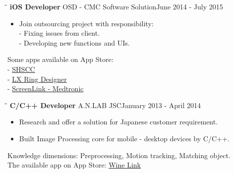\documentclass[margin, 10pt]{res}
\begin{document}
\begin{resume}
   \begin{tabbing}
   \hspace{2.0in}\= \hspace{2.0in}\= \kill %
   {\bf iOS Developer} \>OSD - CMC  Software Solution\>June 2014 - July 2015\\
   \end{tabbing}\vspace{-20pt} %

   \begin{itemize}
   		\item Join outsourcing project with responsibility: \\ - Fixing issues from client. \\ - Developing new functions and UIs. 
		
   \end{itemize}
   Some apps available on App Store:   
   \\ - {\color{blue}\href{https://itunes.apple.com/sg/app/shscc/id984461329?mt=8}{SHSCC}}
   \\ - {\color{blue}\href{https://itunes.apple.com/us/app/lx-ring-designer/id878072384?mt=8}{LX Ring Designer}}				
   \\ - {\color{blue}\href{https://itunes.apple.com/ca/app/screenlink-medtronic/id602846516?mt=8}{ScreenLink - Medtronic}}
   
   \begin{tabbing}
   \hspace{2.0in}\= \hspace{2.0in}\= \kill %
   {\bf C/C++ Developer} \>A.N.LAB JSC\>January 2013 - April 2014\\
   \end{tabbing}\vspace{-20pt} %

   \begin{itemize}
   		\item Research and offer a solution for Japanese customer requirement. 
		\item Built Image Processing core for mobile - desktop devices by C/C++.		
		
   \end{itemize}
   Knowledge dimensions: Preprocessing, Motion tracking, Matching object.   
   \\ The available app on App Store: {\color{blue}\href{https://itunes.apple.com/jp/app/wine-link/id395904799?mt=8}{Wine Link}}
	

\end{resume}
\end{document}
